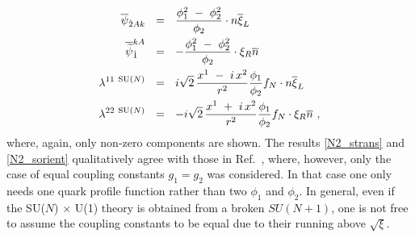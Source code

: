 \documentclass[12pt]{article}
\newcommand{\wt}{\widetilde}
\newcommand{\ov}{\overline}
\newcommand{\sunu}{{\rm SU($N$) $\times$ U(1)} }
\newcommand{\nbar}{\ov{n}}
\begin{document}
\begin{align}
\label{N2_sorient}
%
\notag
\overline{\psi}_{\dot{2}Ak} & ~~=~~ \frac{\phi_1^2 ~-~ \phi_2^2}{\phi_2} \cdot n \overline{\xi}_L   \\
%
\notag
\overline{\wt{\psi}}_{\dot{1}}^{kA}  & ~~=~~ - \frac{\phi_1^2 ~-~ \phi_2^2}{\phi_2} \cdot \xi_R \nbar  \\
%
\lambda^{11\ \text{SU($N$)}} & ~~=~~ i \sqrt{2}\, \frac{ x^1 ~-~ i\, x^2 }{r^2} 
						  \frac{\phi_1}{\phi_2} f_N \cdot n \overline{\xi}_L \\
%
\notag
\lambda^{22\ \text{SU($N$)}} & ~~=~~ - i \sqrt{2}\, \frac{ x^1 ~+~ i\, x^2 }{r^2} 
						    \frac{\phi_1}{\phi_2} f_N \cdot \xi_R \nbar 
	~,
\end{align}
	where, again, only non-zero components are shown. 
	The results \eqref{N2_strans} and \eqref{N2_sorient} qualitatively agree with those in Ref.~\cite{Edalati},
	where, however, only the case of equal coupling constants $ g_1 = g_2 $ was considered.
	In that case one only needs one quark profile function rather than two $ \phi_1 $ and $ \phi_2 $.
	In general, even if the \sunu theory is obtained from a broken $ SU(N+1) $, 
	one is not free to assume the coupling constants to be equal due to their running above $ \sqrt{\xi} $.
\end{document}
